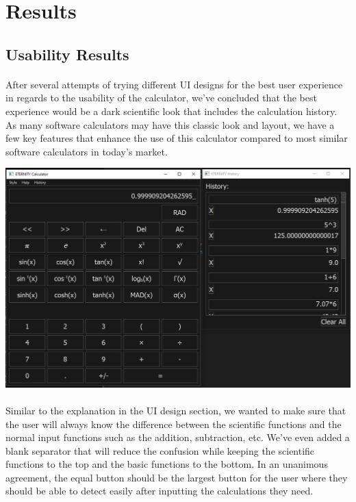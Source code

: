\section{Results}
    \subsection{Usability Results}
        \paragraph{}
        After several attempts of trying different UI designs for the best user experience in regards to the usability of the calculator, we’ve concluded that the best experience would be a dark scientific look that includes the calculation history. As many software calculators may have this classic look and layout, we have a few key features that enhance the use of this calculator compared to most similar software calculators in today's market.

        \begin{center}
            \includegraphics[scale=0.3]{images/usability}
        \end{center}

        \paragraph{}
        Similar to the explanation in the UI design section, we wanted to make sure that the user will always know the difference between the scientific functions and the normal input functions such as the addition, subtraction, etc. We’ve even added a blank separator that will reduce the confusion while keeping the scientific functions to the top and the basic functions to the bottom. In an unanimous agreement, the equal button should be the largest button for the user where they should be able to detect easily after inputting the calculations they need.


